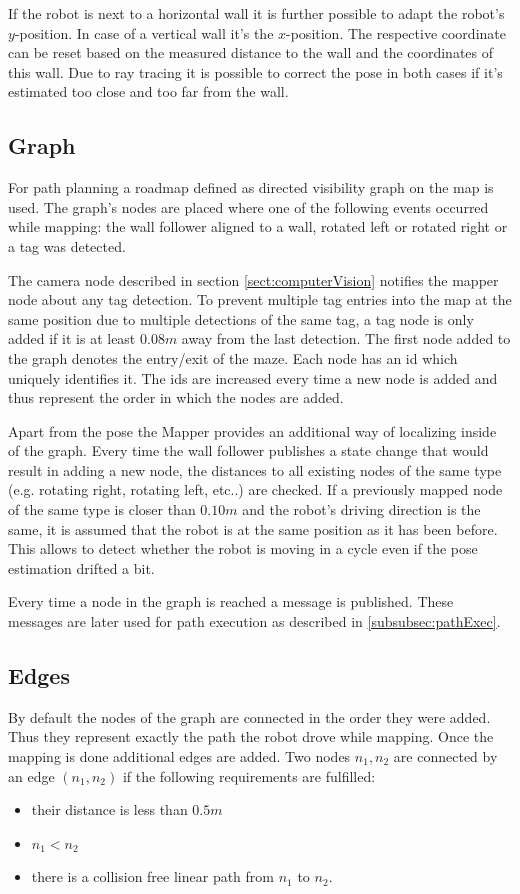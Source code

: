 If the robot is next to a horizontal wall it is further possible to adapt the robot's $y$-position. In case of a vertical wall it's the $x$-position.
The respective coordinate can be reset based on the measured distance to the wall and the coordinates of this wall. Due to ray tracing it is possible to correct the pose in both cases if it's estimated too close and too far from the wall. 

\subsection{Graph}

For path planning a roadmap defined as directed visibility graph on the map is used. The graph's nodes are placed where one of the following events occurred while mapping: the wall follower aligned to a wall, rotated left or rotated right or a tag was detected. 

The camera node described in section \ref{sect:computerVision} notifies the mapper node about any tag detection. To prevent multiple tag entries into the map at the same position due to multiple detections of the same tag, a tag node is only added if it is at least $0.08m$ away from the last detection. 
The first node added to the graph denotes the entry/exit of the maze.
Each node has an id which uniquely identifies it. The ids are increased every time a new node is added and thus represent the order in which the nodes are added.

Apart from the pose the Mapper provides an additional way of localizing inside of the graph. Every time the wall follower publishes a state change that would result in adding a new node, the distances to all existing nodes of the same type (e.g. rotating right, rotating left, etc..) are checked.
If a previously mapped node of the same type is closer than $0.10m$ and the robot's driving direction is the same, it is assumed that the robot is at the same position as it has been before. This allows to detect whether the robot is moving in a cycle even if the pose estimation drifted a bit. 

Every time a node in the graph is reached a message is published. These messages are later used for path execution as described in \ref{subsubsec:pathExec}.

\subsection{Edges}

By default the nodes of the graph are connected in the order they were added. Thus they represent exactly the path the robot drove while mapping. Once the mapping is done additional edges are added. Two nodes $n_1,n_2$ are connected by an edge $(n_1,n_2)$ if the following requirements are fulfilled:
\begin{itemize}
 \item their distance is less than $0.5m$
 \item $n_1 < n_2$
 \item there is a collision free linear path from $n_1$ to $n_2$.
\end{itemize}

